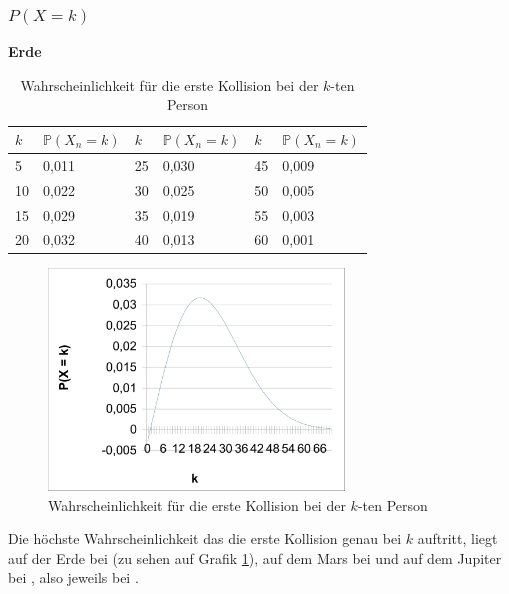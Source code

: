 \documentclass[../main.tex]{subfiles}
\begin{document}
\subsubsection{$P(X = k)$}

\textbf{Erde}

\begin{table}[h]
\centering
\begin{tabular}{|l|l|l|l|l|l|}
\hline
$k$  & $\mathbb{P}(X_{n} = k)$ & $k$  & $\mathbb{P}(X_{n} = k)$ & $k$  & $\mathbb{P}(X_{n} = k)$ \\ \hline
5  & 0,011            & 25 & 0,030            & 45 & 0,009            \\
10 & 0,022            & 30 & 0,025            & 50 & 0,005            \\
15 & 0,029            & 35 & 0,019            & 55 & 0,003            \\
20 & 0,032            & 40 & 0,013            & 60 & 0,001      \\ \hline
\end{tabular}
\caption{\label{num.tpeqe} Wahrscheinlichkeit für die erste Kollision bei der $k$-ten Person}
\end{table}

\begin{figure}[h]
\begin{center}
 \includegraphics[width=0.7\textwidth]{../graphics/peq.png}
\end{center}
\caption{\label{num.fpeqe} Wahrscheinlichkeit für die erste Kollision bei der $k$-ten Person}
\end{figure}



Die höchste Wahrscheinlichkeit das die erste Kollision genau bei $k$ auftritt, liegt auf der Erde bei  (zu sehen auf Grafik \ref{num.fpeqe}), auf dem Mars bei  und auf dem Jupiter bei , also jeweils bei .
\end{document}
